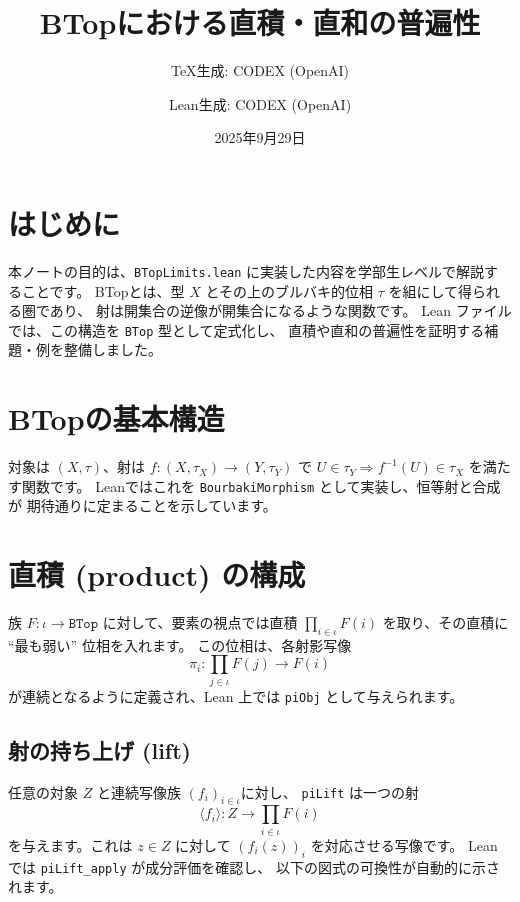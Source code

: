 \documentclass[a4paper]{ltjsarticle}
\title{BTopにおける直積・直和の普遍性}
\author{TeX生成: CODEX (OpenAI) \and Lean生成: CODEX (OpenAI)}
\date{2025年9月29日}
\begin{document}
\maketitle

\section{はじめに}
本ノートの目的は、\texttt{BTopLimits.lean} に実装した内容を学部生レベルで解説することです。
BTopとは、型 $X$ とその上のブルバキ的位相 $\tau$ を組にして得られる圏であり、
射は開集合の逆像が開集合になるような関数です。
Lean ファイルでは、この構造を \texttt{BTop} 型として定式化し、
直積や直和の普遍性を証明する補題・例を整備しました。

\section{BTopの基本構造}
対象は $(X,\tau)$、射は $f\colon (X,\tau_X)\to (Y,\tau_Y)$ で
$U\in\tau_Y \Rightarrow f^{-1}(U)\in\tau_X$ を満たす関数です。
Leanではこれを \verb|BourbakiMorphism| として実装し、恒等射と合成が
期待通りに定まることを示しています。

\section{直積 (product) の構成}
族 $F\colon \iota\to\texttt{BTop}$ に対して、要素の視点では直積
$\prod_{i\in\iota} F(i)$ を取り、その直積に ``最も弱い'' 位相を入れます。
この位相は、各射影写像
\[
\pi_i\colon \prod_{j\in\iota} F(j) \longrightarrow F(i)
\]
が連続となるように定義され、Lean 上では \verb|piObj| として与えられます。

\subsection{射の持ち上げ (lift)}
任意の対象 $Z$ と連続写像族 $(f_i)_{i\in\iota}$に対し、
\verb|piLift| は一つの射
\[
\langle f_i\rangle \colon Z \longrightarrow \prod_{i\in\iota} F(i)
\]
を与えます。これは $z\in Z$ に対して $(f_i(z))_i$ を対応させる写像です。
Lean では \verb|piLift_apply| が成分評価を確認し、
以下の図式の可換性が自動的に示されます。

\begin{center}
\end{center}
\end{document}
